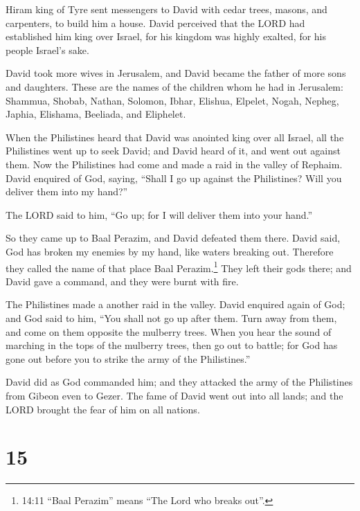  Hiram king of Tyre sent messengers to David with cedar
trees, masons, and carpenters, to build him a house.  David
perceived that the LORD had established him king over Israel, for his
kingdom was highly exalted, for his people Israel's sake.

 David took more wives in Jerusalem, and David became the
father of more sons and daughters.  These are the names of
the children whom he had in Jerusalem: Shammua, Shobab, Nathan, Solomon,
 Ibhar, Elishua, Elpelet,  Nogah, Nepheg,
Japhia,  Elishama, Beeliada, and Eliphelet.

 When the Philistines heard that David was anointed king
over all Israel, all the Philistines went up to seek David; and David
heard of it, and went out against them.  Now the Philistines
had come and made a raid in the valley of Rephaim.  David
enquired of God, saying, ``Shall I go up against the Philistines? Will
you deliver them into my hand?''

The LORD said to him, ``Go up; for I will deliver them into your hand.''

 So they came up to Baal Perazim, and David defeated them
there. David said, God has broken my enemies by my hand, like waters
breaking out. Therefore they called the name of that place Baal
Perazim.\footnote{14:11 ``Baal Perazim'' means ``The Lord who breaks
  out''.}  They left their gods there; and David gave a
command, and they were burnt with fire.

 The Philistines made a another raid in the valley.
 David enquired again of God; and God said to him, ``You
shall not go up after them. Turn away from them, and come on them
opposite the mulberry trees.  When you hear the sound of
marching in the tops of the mulberry trees, then go out to battle; for
God has gone out before you to strike the army of the Philistines.''

 David did as God commanded him; and they attacked the army
of the Philistines from Gibeon even to Gezer.  The fame of
David went out into all lands; and the LORD brought the fear of him on
all nations.

\hypertarget{section-14}{%
\section{15}\label{section-14}}

